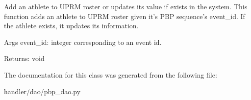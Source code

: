 \begin{DoxyVerb}Add an athlete to UPRM roster or updates its value if exists in the system.
This function adds an athlete to UPRM roster given it's PBP sequence's event_id.
If the athlete exists, it updates its information.

Args
    event_id: integer corresponding to an event id.

Returns:
    void
\end{DoxyVerb}
 

The documentation for this class was generated from the following file\+:\begin{DoxyCompactItemize}
\item 
handler/dao/pbp\+\_\+dao.\+py\end{DoxyCompactItemize}
